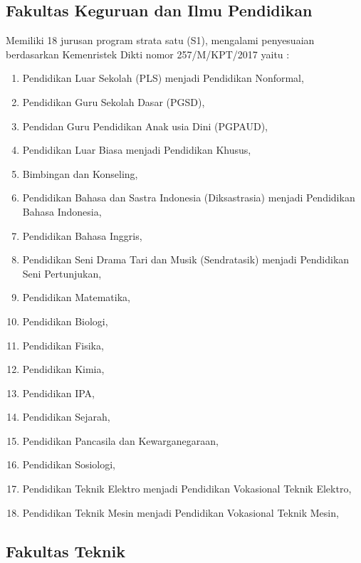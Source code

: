\documentclass[
]{book}
\providecommand{\tightlist}{%
  \setlength{\itemsep}{0pt}\setlength{\parskip}{0pt}}
\begin{document}
\hypertarget{fakultas-keguruan-dan-ilmu-pendidikan}{%
\subsection{Fakultas Keguruan dan Ilmu Pendidikan}\label{fakultas-keguruan-dan-ilmu-pendidikan}}

Memiliki 18 jurusan program strata satu (S1), mengalami penyesuaian berdasarkan Kemenristek Dikti nomor 257/M/KPT/2017 yaitu :

\begin{enumerate}
\def\labelenumi{\arabic{enumi}.}
\tightlist
\item
  Pendidikan Luar Sekolah (PLS) menjadi Pendidikan Nonformal,\\
\item
  Pendidikan Guru Sekolah Dasar (PGSD),
\item
  Pendidan Guru Pendidikan Anak usia Dini (PGPAUD),
\item
  Pendidikan Luar Biasa menjadi Pendidikan Khusus,
\item
  Bimbingan dan Konseling,
\item
  Pendidikan Bahasa dan Sastra Indonesia (Diksastrasia) menjadi Pendidikan Bahasa Indonesia,
\item
  Pendidikan Bahasa Inggris,
\item
  Pendidikan Seni Drama Tari dan Musik (Sendratasik) menjadi Pendidikan Seni Pertunjukan,
\item
  Pendidikan Matematika,
\item
  Pendidikan Biologi,
\item
  Pendidikan Fisika,
\item
  Pendidikan Kimia,
\item
  Pendidikan IPA,
\item
  Pendidikan Sejarah,
\item
  Pendidikan Pancasila dan Kewarganegaraan,
\item
  Pendidikan Sosiologi,
\item
  Pendidikan Teknik Elektro menjadi Pendidikan Vokasional Teknik Elektro,
\item
  Pendidikan Teknik Mesin menjadi Pendidikan Vokasional Teknik Mesin,
\end{enumerate}

\hypertarget{fakultas-teknik}{%
\subsection{Fakultas Teknik}\label{fakultas-teknik}}
\end{document}
